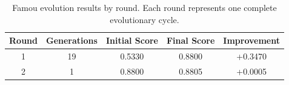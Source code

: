 \begin{table}[t]
\centering
\caption{Famou evolution results by round. Each round represents one complete evolutionary cycle.}
\label{tab:evolution_results}
\begin{tabular}{ccccc}
\toprule
\textbf{Round} & \textbf{Generations} & \textbf{Initial Score} & \textbf{Final Score} & \textbf{Improvement} \\
\midrule
1 & 19 & 0.5330 & 0.8800 & +0.3470 \\
2 & 1 & 0.8800 & 0.8805 & +0.0005 \\
\bottomrule
\end{tabular}
\end{table}